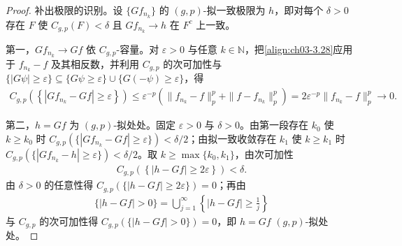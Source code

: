 \documentclass[../../main.tex]{subfiles}%
\begin{document}
\begin{proof}
补出极限的识别。设 $\{Gf_{n_k}\}$ 的 $(g,p)$-拟一致极限为 $h$，即对每个 $\delta>0$ 存在 $F$ 使 $C_{g,p}(F)<\delta$ 且 $Gf_{n_k}\to h$ 在 $F^c$ 上一致。

第一，$Gf_{n_k}\to Gf$ 依 $C_{g,p}$-容量。对 $\varepsilon>0$ 与任意 $k\in\mathbb{N}$，把\eqref{align:ch03-3.28}应用于 $f_{n_k}-f$ 及其相反数，并利用 $C_{g,p}$ 的次可加性与 $\{|G\psi|\geqslant\varepsilon\}\subseteq\{G\psi\geqslant\varepsilon\}\cup\{G(-\psi)\geqslant\varepsilon\}$，得
\begin{align*}
C_{g,p}\left(\left\{|Gf_{n_k}-Gf|\geqslant\varepsilon\right\}\right)
\leqslant\varepsilon^{-p}\left(\|f_{n_k}-f\|_p^p+\|f-f_{n_k}\|_p^p\right)=2\varepsilon^{-p}\|f_{n_k}-f\|_p^p\to0.
\end{align*}

第二，$h=Gf$ 为 $(g,p)$-拟处处。固定 $\varepsilon>0$ 与 $\delta>0$。由第一段存在 $k_0$ 使 $k\geqslant k_0$ 时 $C_{g,p}(\{|Gf_{n_k}-Gf|\geqslant\varepsilon\})<\delta/2$；由拟一致收敛存在 $k_1$ 使 $k\geqslant k_1$ 时 $C_{g,p}(\{|Gf_{n_k}-h|\geqslant\varepsilon\})<\delta/2$。取 $k\geqslant\max\{k_0,k_1\}$，由次可加性
\begin{align*}
C_{g,p}\left(\left\{|h-Gf|\geqslant2\varepsilon\right\}\right)<\delta.
\end{align*}
由 $\delta>0$ 的任意性得 $C_{g,p}(\{|h-Gf|\geqslant2\varepsilon\})=0$；再由
\begin{align*}
\{|h-Gf|>0\}=\bigcup_{j=1}^\infty\left\{|h-Gf|\geqslant\frac1j\right\}
\end{align*}
与 $C_{g,p}$ 的次可加性得 $C_{g,p}(\{|h-Gf|>0\})=0$，即 $h=Gf$ $(g,p)$-拟处处。
\end{proof}
\end{document}
